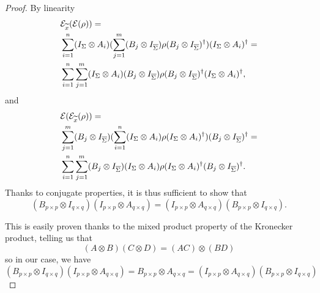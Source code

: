 \begin{proof}
	By linearity 
	\begin{align*}
	&\mathcal{E}_{\widetilde{x}}(\mathcal{E}(\rho)) =\\ 
	&\sum_{i = 1}^{n} (I_{\Sigma} \otimes A_i) (\sum_{j = 1}^{m} (B_j \otimes I_{\overline{\Sigma}}) \rho (B_j \otimes I_{\overline{\Sigma}})^{\dagger}) (I_{\Sigma} \otimes A_i)^{\dagger} =\\
	&\sum_{i = 1}^{n} \sum_{j = 1}^{m} (I_{\Sigma} \otimes A_i) (B_j \otimes I_{\overline{\Sigma}}) \rho (B_j \otimes I_{\overline{\Sigma}})^{\dagger} (I_{\Sigma} \otimes A_i)^{\dagger},
	\end{align*}
	and
	\begin{align*}
	&\mathcal{E}(\mathcal{E}_{\widetilde{x}}(\rho)) =\\
	&\sum_{j = 1}^{m} (B_j \otimes I_{\overline{\Sigma}}) (\sum_{i = 1}^{n} (I_{\Sigma} \otimes A_i) \rho (I_{\Sigma} \otimes A_i)^{\dagger}) (B_j \otimes I_{\overline{\Sigma}})^{\dagger} =\\
	&\sum_{i = 1}^{n} \sum_{j = 1}^{m} (B_j \otimes I_{\overline{\Sigma}}) (I_{\Sigma} \otimes A_i) \rho (I_{\Sigma} \otimes A_i)^{\dagger} (B_j \otimes I_{\overline{\Sigma}})^{\dagger}.
	\end{align*}
	Thanks to conjugate properties, it is thus sufficient to show that
	\[
	(B_{p\times p} \otimes I_{q\times q}) (I_{p\times p} \otimes A_{q\times q}) = (I_{p\times p} \otimes A_{q\times q}) (B_{p\times p} \otimes I_{q\times q}).
	\]
	
	This is easily proven thanks to the mixed product property of the Kronecker product, telling us that 
	\[ (A \otimes B)(C \otimes D) = (AC)\otimes(BD)
	\]
	so in our case, we have 
	\[
	(B_{p\times p} \otimes I_{q\times q}) (I_{p\times p} \otimes A_{q\times q}) = B_{p\times p} \otimes A_{q \times q} = (I_{p\times p} \otimes A_{q\times q}) (B_{p\times p} \otimes I_{q\times q})
	\]	
	

\end{proof}
